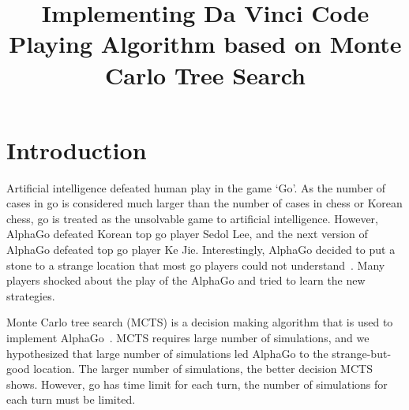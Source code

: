 \documentclass[conference]{IEEEtran}
\begin{document}
\title{Implementing Da Vinci Code Playing Algorithm based on Monte Carlo Tree Search}

\author{
\and
{}
\and
{}
}

\maketitle


\begin{abstract}
%
\end{abstract}




\IEEEpeerreviewmaketitle


\section{Introduction}

Artificial intelligence defeated human play in the game `Go'.
As the number of cases in go is considered much larger than the number of cases in chess or Korean chess, go is treated as the unsolvable game to artificial intelligence.
However, AlphaGo defeated Korean top go player Sedol Lee, and the next version of AlphaGo defeated top go player Ke Jie.
Interestingly, AlphaGo decided to put a stone to a strange location that most go players could not understand~\cite{wierd_alphago}.
Many players shocked about the play of the AlphaGo and tried to learn the new strategies.

Monte Carlo tree search (MCTS) is a decision making algorithm that is used to implement AlphaGo~\cite{silver2016mastering_alphago}.
MCTS requires large number of simulations, and we hypothesized that large number of simulations led AlphaGo to the strange-but-good location.
The larger number of simulations, the better decision MCTS shows.
However, go has time limit for each turn, the number of simulations for each turn must be limited.
\end{document}
